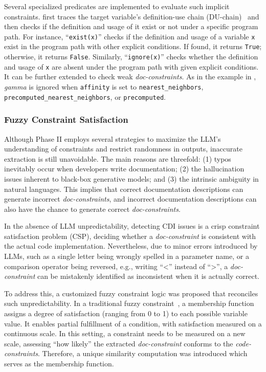 Several specialized predicates are implemented to evaluate such implicit constraints. \toolchecker first traces the target variable's definition-use chain (DU-chain)~\cite{kennedy1978use, harrold1994efficient} and then checks if the definition and usage of it exist or not under a specific program path. For instance, ``\texttt{exist(x)}'' checks if the definition and usage of a variable \texttt{x} exist in the program path with other explicit conditions. If found, it returns \texttt{True}; otherwise, it returns \texttt{False}. Similarly, ``\texttt{ignore(x)}'' checks whether the definition and usage of \texttt{x} are absent under the program path with given explicit conditions. It can be further extended to check weak \emph{doc-constraints}. As in the example in , \textit{gamma} is ignored when \texttt{affinity} is set to \texttt{nearest\_neighbors}, \texttt{precomputed\_nearest\_neighbors}, or \texttt{precomputed}.



\subsubsection{Fuzzy Constraint Satisfaction}\label{sec:fuzzlogic-mpchecker}

Although Phase II employs several strategies to maximize the LLM's understanding of constraints and restrict randomness in outputs, inaccurate extraction is still unavoidable.
The main reasons are threefold: (1) typos inevitably occur when developers write documentation; (2)
the hallucination issues inherent to black-box generative models; and (3) the intrinsic ambiguity in
natural languages. This implies that correct documentation descriptions can generate incorrect \emph{doc-constraints}, and incorrect documentation descriptions can also have the chance to generate correct \emph{doc-constraints}.

In the absence of LLM unpredictability, detecting CDI issues is a crisp constraint satisfaction
problem (CSP), deciding whether a \emph{doc-constraint} is consistent with the actual code implementation.
Nevertheless, due to minor errors introduced by LLMs, such as a single letter being wrongly spelled
in a parameter name, or a comparison operator being reversed, e.g., writing ``<'' instead of ``>'',
a \emph{doc-constraint} can be mistakenly identified as inconsistent when it is actually correct.

To address this, a customized fuzzy constraint logic was proposed that reconciles such
unpredictability.
In a traditional fuzzy constraint~\cite{kosko1993fuzzy, ruttkay1994fuzzy}, a membership function
assigns a degree of satisfaction (ranging from 0 to 1) to each possible variable value.
It enables partial fulfillment of a condition, with satisfaction measured on a continuous scale.
In this setting, a constraint needs to be measured on a new scale, assessing ``how likely'' the
extracted \emph{doc-constraint} conforms to the \emph{code-constraints}.
Therefore, a unique similarity computation was introduced which serves as the membership function.

